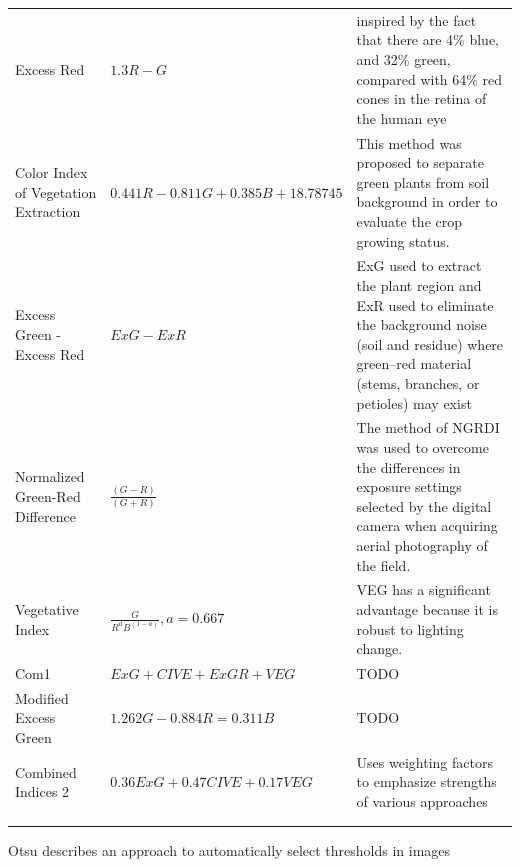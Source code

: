 \documentclass[letterpaper]{article}
\begin{document}
{{\begin{longtable}{x{\dimexpr.2\tabcolsep}
                  x{\dimexpr.4\tabcolsep}
                  x{\dimexpr.4\tabcolsep}}
		Excess Red      
		& $1.3 R - G$ 
		& inspired by the fact that there are 4\% blue, and 32\% green, compared with 64\% red cones in the retina of the human eye
\tabularnewline\addlinespace

		Color Index of Vegetation Extraction      
		& $0.441 R - 0.811 G + 0.385 B + 18.78745$
		& This method was proposed to separate green plants from soil background in order to evaluate the crop growing status.
\tabularnewline\addlinespace

		Excess Green - Excess Red   
		& $ExG - ExR$ 
		& ExG used to extract the plant region and ExR used to eliminate the background noise (soil and residue) where green–red material (stems, branches, or petioles) may exist
\tabularnewline\addlinespace

		Normalized Green-Red Difference    
		& $\frac {(G - R)} {(G + R)}$ 
		& The method of NGRDI was used to overcome the differences in exposure settings selected by the digital camera when acquiring aerial photography of the field. 
\tabularnewline\addlinespace

		Vegetative Index      
		& $\frac {G} {R^aB^{(1-a)}}, a = 0.667$ 
		& VEG has a significant advantage because it is robust to lighting change.
\tabularnewline\addlinespace

		Com1   
		& $ExG + CIVE + ExGR + VEG$ 
		& TODO
\tabularnewline\addlinespace

		Modified Excess Green      
		& $1.262G - 0.884R = 0.311B$ 
		& TODO 
\tabularnewline\addlinespace

		Combined Indices 2      
		& $0.36ExG + 0.47CIVE + 0.17VEG$ 
		& Uses weighting factors to emphasize strengths of various approaches
\tabularnewline\addlinespace

\tabularnewline\addlinespace
\end{longtable}
Otsu describes an approach to automatically select thresholds in images \cite{Otsu1979-io}


}}
\end{document}
